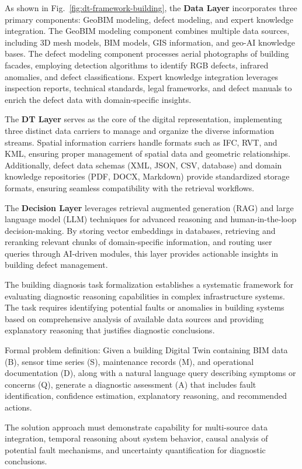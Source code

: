 As shown in Fig.~\ref{fig:dt-framework-building}, the \textbf{Data Layer} incorporates three primary components: GeoBIM modeling, defect modeling, and expert knowledge integration. The GeoBIM modeling component combines multiple data sources, including 3D mesh models, BIM models, GIS information, and geo-AI knowledge bases. The defect modeling component processes aerial photographs of building facades, employing detection algorithms to identify RGB defects, infrared anomalies, and defect classifications. Expert knowledge integration leverages inspection reports, technical standards, legal frameworks, and defect manuals to enrich the defect data with domain-specific insights.

The \textbf{DT Layer} serves as the core of the digital representation, implementing three distinct data carriers to manage and organize the diverse information streams. Spatial information carriers handle formats such as IFC, RVT, and KML, ensuring proper management of spatial data and geometric relationships. Additionally, defect data schemas (XML, JSON, CSV, database) and domain knowledge repositories (PDF, DOCX, Markdown) provide standardized storage formats, ensuring seamless compatibility with the retrieval workflows.

The \textbf{Decision Layer} leverages retrieval augmented generation (RAG) and large language model (LLM) techniques for advanced reasoning and human-in-the-loop decision-making. By storing vector embeddings in databases, retrieving and reranking relevant chunks of domain-specific information, and routing user queries through AI-driven modules, this layer provides actionable insights in building defect management.

The building diagnosis task formalization establishes a systematic framework for evaluating diagnostic reasoning capabilities in complex infrastructure systems. The task requires identifying potential faults or anomalies in building systems based on comprehensive analysis of available data sources and providing explanatory reasoning that justifies diagnostic conclusions.

Formal problem definition: Given a building Digital Twin containing BIM data (B), sensor time series (S), maintenance records (M), and operational documentation (D), along with a natural language query describing symptoms or concerns (Q), generate a diagnostic assessment (A) that includes fault identification, confidence estimation, explanatory reasoning, and recommended actions.

The solution approach must demonstrate capability for multi-source data integration, temporal reasoning about system behavior, causal analysis of potential fault mechanisms, and uncertainty quantification for diagnostic conclusions.

